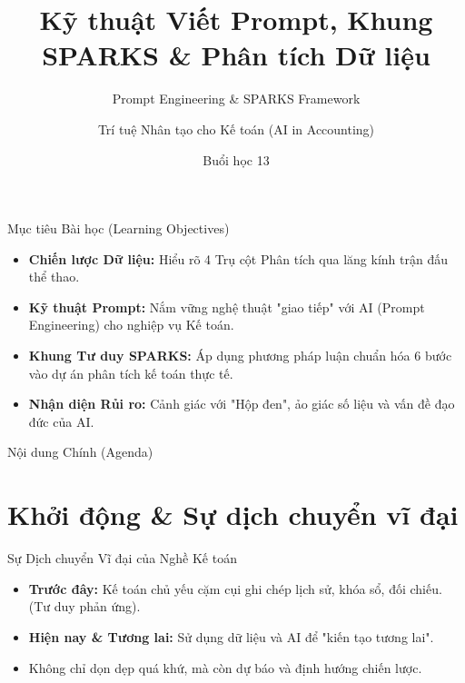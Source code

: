 \documentclass[aspectratio=169,12pt]{beamer}
\title[AI trong Kế toán - Buổi 13]{Kỹ thuật Viết Prompt, Khung SPARKS \& Phân tích Dữ liệu}
\subtitle{Prompt Engineering \& SPARKS Framework}
\author[Giảng viên]{Trí tuệ Nhân tạo cho Kế toán (AI in Accounting)}
\institute[Đại học]{Khoa Kế toán - Kiểm toán}
\date{Buổi học 13}
\begin{document}
\begin{frame}
    \titlepage
\end{frame}

\begin{frame}{Mục tiêu Bài học (Learning Objectives)}
    \begin{itemize}
        \item \textbf{Chiến lược Dữ liệu:} Hiểu rõ 4 Trụ cột Phân tích qua lăng kính trận đấu thể thao.
        \item \textbf{Kỹ thuật Prompt:} Nắm vững nghệ thuật "giao tiếp" với AI (Prompt Engineering) cho nghiệp vụ Kế toán.
        \item \textbf{Khung Tư duy SPARKS:} Áp dụng phương pháp luận chuẩn hóa 6 bước vào dự án phân tích kế toán thực tế.
        \item \textbf{Nhận diện Rủi ro:} Cảnh giác với "Hộp đen", ảo giác số liệu và vấn đề đạo đức của AI.
    \end{itemize}
\end{frame}

\begin{frame}{Nội dung Chính (Agenda)}
    \tableofcontents
\end{frame}

\section{Khởi động \& Sự dịch chuyển vĩ đại}
\begin{frame}
    \tableofcontents[currentsection]
\end{frame}

\begin{frame}{Sự Dịch chuyển Vĩ đại của Nghề Kế toán}
    \begin{itemize}
        \item \textbf{Trước đây:} Kế toán chủ yếu cặm cụi ghi chép lịch sử, khóa sổ, đối chiếu. (Tư duy phản ứng).
        \item \textbf{Hiện nay \& Tương lai:} Sử dụng dữ liệu và AI để "kiến tạo tương lai".
        \item Không chỉ dọn dẹp quá khứ, mà còn dự báo và định hướng chiến lược.
    \end{itemize}
\end{frame}
\end{document}
